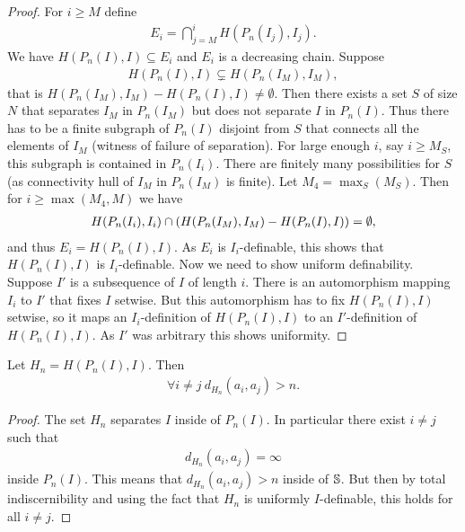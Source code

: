 \begin{proof}
  For $i \geq M$ define
  \begin{align*}
    E_i = \bigcap_{j = M}^{i} H(P_n(I_j), I_j).
  \end{align*}
  We have $H(P_n(I), I) \subseteq E_i$ and $E_i$ is a decreasing chain.
  Suppose
  \begin{align*}
    H(P_n(I), I) \subsetneq H(P_n(I_M), I_M),    
  \end{align*}
  that is ${H(P_n(I_M), I_M) - H(P_n(I), I)} \neq \emptyset$.
  Then there exists a set $S$ of size $N$ that separates $I_M$ in $P_n(I_M)$ but does not separate $I$ in $P_n(I)$.
  Thus there has to be a finite subgraph of $P_n(I)$ disjoint from $S$ that connects all the elements of $I_M$ (witness of failure of separation).
  For large enough $i$, say $i \geq M_S$, this subgraph is contained in $P_n(I_i)$.
  There are finitely many possibilities for $S$ (as connectivity hull of $I_M$ in $P_n(I_M)$ is finite).
  Let $M_4 = \max_S(M_S)$.
  Then for $i \geq \max(M_4, M)$ we have
  \begin{align*}
    H(P_n(I_i), I_i) \cap \left(H(P_n(I_M), I_M) - H(P_n(I), I)\right) = \emptyset,    
  \end{align*}
  and thus $E_i = H(P_n(I), I)$.
  As $E_i$ is $I_i$-definable, this shows that $H(P_n(I), I)$ is $I_i$-definable.
  Now we need to show uniform definability.
  Suppose $I'$ is a subsequence of $I$ of length $i$.
  There is an automorphism mapping $I_i$ to $I'$ that fixes $I$ setwise.
  But this automorphism has to fix $H(P_n(I), I)$ setwise,
  so it maps an $I_i$-definition of $H(P_n(I), I)$ to an $I'$-definition of $H(P_n(I), I)$.
  As $I'$ was arbitrary this shows uniformity.
\end{proof}

\begin{Corollary} \label{inf_dis_corr}
  Let $H_n = H(P_n(I), I)$.
  Then 
  \begin{align*}
    \forall i \neq j \ d_{H_n}(a_i, a_j) > n.
  \end{align*}
\end{Corollary}

\begin{proof}
  The set $H_n$ separates $I$ inside of $P_n(I)$.
  In particular there exist $i \neq j$ such that
  \begin{align*}
    d_{H_n}(a_i, a_j) = \infty    
  \end{align*}
  inside $P_n(I)$.
  This means that $d_{H_n}(a_i, a_j) > n$ inside of $\mathbb S$.
  But then by total indiscernibility and using the fact that $H_n$ is uniformly $I$-definable, this holds for all $i \neq j$.
\end{proof}

